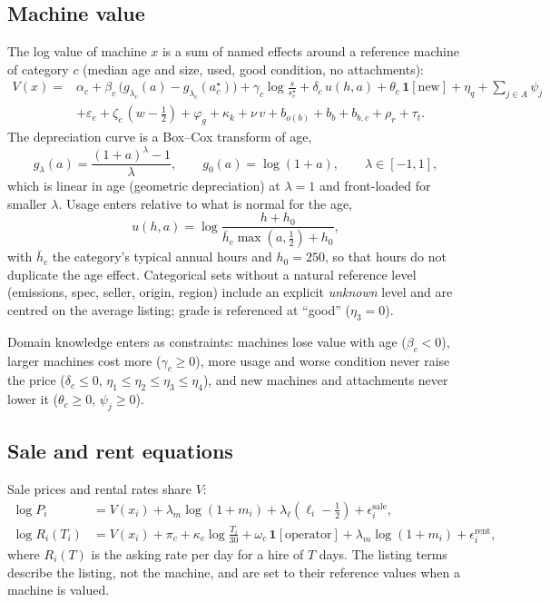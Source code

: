 \documentclass[11pt]{article}
\begin{document}
\subsection{Machine value}
The log value of machine $x$ is a sum of named effects around a reference machine of category $c$
(median age and size, used, good condition, no attachments):
\begin{align}
V(x) ={}& \alpha_c + \beta_c\,\bigl(g_{\lambda_c}(a) - g_{\lambda_c}(a^\star_c)\bigr)
        + \gamma_c \log\frac{s}{s^\star_c} + \delta_c\,u(h,a) + \theta_c\,\mathbf{1}[\text{new}]
        + \eta_q + \sum_{j\in A}\psi_j \nonumber\\
      & + \varepsilon_e + \zeta_c\,(w-\tfrac12) + \varphi_g + \kappa_k + \nu\,v
        + b_{o(b)} + b_b + b_{b,c} + \rho_r + \tau_t . \label{eq:value}
\end{align}
The depreciation curve is a Box--Cox transform of age,
\begin{equation}
g_\lambda(a) = \frac{(1+a)^\lambda - 1}{\lambda},\qquad g_0(a) = \log(1+a),\qquad \lambda\in[-1,1],
\end{equation}
which is linear in age (geometric depreciation) at $\lambda=1$ and front-loaded for smaller
$\lambda$. Usage enters relative to what is normal for the age,
\begin{equation}
u(h,a) = \log\frac{h + h_0}{\bar h_c \max(a,\tfrac12) + h_0},
\end{equation}
with $\bar h_c$ the category's typical annual hours and $h_0=250$, so that hours do not duplicate
the age effect. Categorical sets without a natural reference level (emissions, spec, seller, origin,
region) include an explicit \emph{unknown} level and are centred on the average listing; grade is
referenced at ``good'' ($\eta_3=0$).

Domain knowledge enters as constraints: machines lose value with age ($\beta_c<0$), larger machines
cost more ($\gamma_c\ge0$), more usage and worse condition never raise the price
($\delta_c\le0$, $\eta_1\le\eta_2\le\eta_3\le\eta_4$), and new machines and attachments never
lower it ($\theta_c\ge0$, $\psi_j\ge0$).

\subsection{Sale and rent equations}
Sale prices and rental rates share $V$:
\begin{align}
\log P_i &= V(x_i) + \lambda_m \log(1+m_i) + \lambda_\ell(\ell_i - \tfrac12) + \epsilon^{\text{sale}}_i,
  \label{eq:sale}\\
\log R_i(T_i) &= V(x_i) + \pi_c + \kappa_c \log\frac{T_i}{30} + \omega_c\,\mathbf{1}[\text{operator}]
  + \lambda_m \log(1+m_i) + \epsilon^{\text{rent}}_i , \label{eq:rent}
\end{align}
where $R_i(T)$ is the asking rate per day for a hire of $T$ days. The listing terms describe the
listing, not the machine, and are set to their reference values when a machine is valued.
\end{document}
